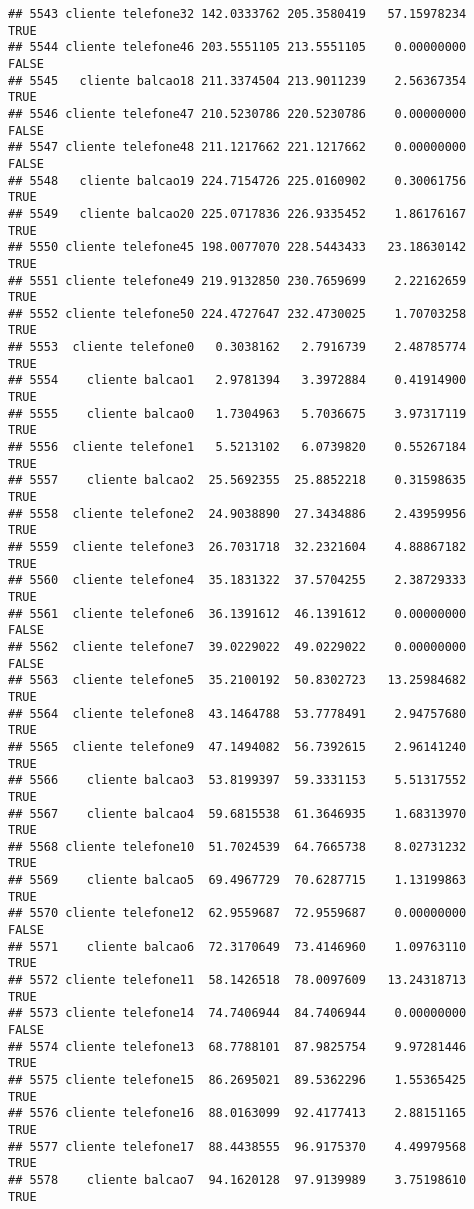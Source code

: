 \documentclass[
]{article}
\begin{document}
\begin{verbatim}
## 5543 cliente telefone32 142.0333762 205.3580419   57.15978234     TRUE
## 5544 cliente telefone46 203.5551105 213.5551105    0.00000000    FALSE
## 5545   cliente balcao18 211.3374504 213.9011239    2.56367354     TRUE
## 5546 cliente telefone47 210.5230786 220.5230786    0.00000000    FALSE
## 5547 cliente telefone48 211.1217662 221.1217662    0.00000000    FALSE
## 5548   cliente balcao19 224.7154726 225.0160902    0.30061756     TRUE
## 5549   cliente balcao20 225.0717836 226.9335452    1.86176167     TRUE
## 5550 cliente telefone45 198.0077070 228.5443433   23.18630142     TRUE
## 5551 cliente telefone49 219.9132850 230.7659699    2.22162659     TRUE
## 5552 cliente telefone50 224.4727647 232.4730025    1.70703258     TRUE
## 5553  cliente telefone0   0.3038162   2.7916739    2.48785774     TRUE
## 5554    cliente balcao1   2.9781394   3.3972884    0.41914900     TRUE
## 5555    cliente balcao0   1.7304963   5.7036675    3.97317119     TRUE
## 5556  cliente telefone1   5.5213102   6.0739820    0.55267184     TRUE
## 5557    cliente balcao2  25.5692355  25.8852218    0.31598635     TRUE
## 5558  cliente telefone2  24.9038890  27.3434886    2.43959956     TRUE
## 5559  cliente telefone3  26.7031718  32.2321604    4.88867182     TRUE
## 5560  cliente telefone4  35.1831322  37.5704255    2.38729333     TRUE
## 5561  cliente telefone6  36.1391612  46.1391612    0.00000000    FALSE
## 5562  cliente telefone7  39.0229022  49.0229022    0.00000000    FALSE
## 5563  cliente telefone5  35.2100192  50.8302723   13.25984682     TRUE
## 5564  cliente telefone8  43.1464788  53.7778491    2.94757680     TRUE
## 5565  cliente telefone9  47.1494082  56.7392615    2.96141240     TRUE
## 5566    cliente balcao3  53.8199397  59.3331153    5.51317552     TRUE
## 5567    cliente balcao4  59.6815538  61.3646935    1.68313970     TRUE
## 5568 cliente telefone10  51.7024539  64.7665738    8.02731232     TRUE
## 5569    cliente balcao5  69.4967729  70.6287715    1.13199863     TRUE
## 5570 cliente telefone12  62.9559687  72.9559687    0.00000000    FALSE
## 5571    cliente balcao6  72.3170649  73.4146960    1.09763110     TRUE
## 5572 cliente telefone11  58.1426518  78.0097609   13.24318713     TRUE
## 5573 cliente telefone14  74.7406944  84.7406944    0.00000000    FALSE
## 5574 cliente telefone13  68.7788101  87.9825754    9.97281446     TRUE
## 5575 cliente telefone15  86.2695021  89.5362296    1.55365425     TRUE
## 5576 cliente telefone16  88.0163099  92.4177413    2.88151165     TRUE
## 5577 cliente telefone17  88.4438555  96.9175370    4.49979568     TRUE
## 5578    cliente balcao7  94.1620128  97.9139989    3.75198610     TRUE

\end{verbatim}
\end{document}
